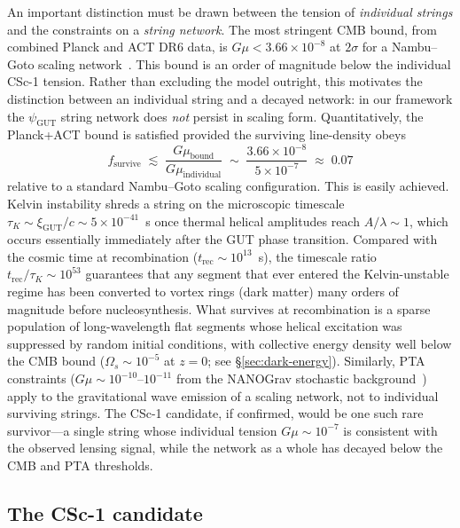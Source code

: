 \documentclass[11pt]{article}
\begin{document}
An important distinction must be drawn between the tension of \emph{individual strings} and the constraints on a \emph{string network}.
The most stringent CMB bound, from combined Planck and ACT DR6 data, is $G\mu < 3.66 \times 10^{-8}$ at $2\sigma$ for a Nambu--Goto scaling network~\cite{Planck2013strings,ACT-DR6-strings}.
This bound is an order of magnitude below the individual CSc-1 tension.
Rather than excluding the model outright, this motivates the distinction between an individual string and a decayed network: in our framework the $\psi_\text{GUT}$ string network does \emph{not} persist in scaling form.
Quantitatively, the Planck+ACT bound is satisfied provided the surviving line-density obeys
\begin{equation}
f_\text{survive} \;\lesssim\; \frac{G\mu_\text{bound}}{G\mu_\text{individual}}
\;\sim\; \frac{3.66 \times 10^{-8}}{5 \times 10^{-7}} \;\approx\; 0.07
\label{eq:fsurvive}
\end{equation}
relative to a standard Nambu--Goto scaling configuration.
This is easily achieved.
Kelvin instability shreds a string on the microscopic timescale $\tau_K \sim \xi_\text{GUT}/c \sim 5 \times 10^{-41}$~s once thermal helical amplitudes reach $A/\lambda \sim 1$, which occurs essentially immediately after the GUT phase transition.
Compared with the cosmic time at recombination ($t_\text{rec} \sim 10^{13}$~s), the timescale ratio $t_\text{rec}/\tau_K \sim 10^{53}$ guarantees that any segment that ever entered the Kelvin-unstable regime has been converted to vortex rings (dark matter) many orders of magnitude before nucleosynthesis.
What survives at recombination is a sparse population of long-wavelength flat segments whose helical excitation was suppressed by random initial conditions, with collective energy density well below the CMB bound ($\Omega_s \sim 10^{-5}$ at $z = 0$; see \S\ref{sec:dark-energy}).
Similarly, PTA constraints ($G\mu \sim 10^{-10}\text{--}10^{-11}$ from the NANOGrav stochastic background~\cite{NANOGrav2023,Ellis2021}) apply to the gravitational wave emission of a scaling network, not to individual surviving strings.
The CSc-1 candidate, if confirmed, would be one such rare survivor---a single string whose individual tension $G\mu \sim 10^{-7}$ is consistent with the observed lensing signal, while the network as a whole has decayed below the CMB and PTA thresholds.

\subsection{The CSc-1 candidate}
\end{document}
